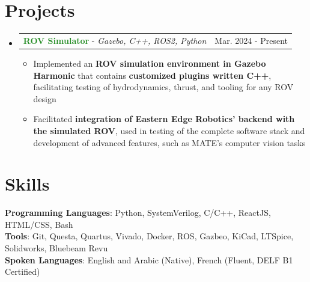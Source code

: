 \documentclass[letterpaper,11pt]{article}
\makeatletter
\newcommand{\resumeItem}[1]{
  \item\small{
    {#1 \vspace{-2pt}}
  }
}
\newcommand{\resumeProjectHeading}[2]{
    \item
    \begin{tabular*}{0.97\textwidth}{l@{\extracolsep{\fill}}r}
      \small#1 & #2 \\
    \end{tabular*}\vspace{-7pt}
}
\newcommand{\resumeSubHeadingListStart}{\begin{itemize}[leftmargin=0.15in, label={}]}
\newcommand{\resumeSubHeadingListEnd}{\end{itemize}}
\newcommand{\resumeItemListStart}{\begin{itemize}}
\newcommand{\resumeItemListEnd}{\end{itemize}\vspace{-5pt}}
\makeatother
\begin{document}
\section{Projects}
    \resumeSubHeadingListStart
      \resumeProjectHeading
          {\textbf{\textcolor{ForestGreen}{ROV Simulator}} - \emph{Gazebo, C++, ROS2, Python}}{Mar. 2024 - Present}
          \resumeItemListStart
            \resumeItem{Implemented an \textbf{ROV simulation environment in Gazebo Harmonic} that contains \textbf{customized 
                        plugins written C++}, facilitating testing of hydrodynamics, thrust, and tooling for any ROV design }
            \resumeItem{Facilitated \textbf{integration of Eastern Edge Robotics' backend with the simulated ROV}, used in
                        testing of the complete software stack and development of advanced features, such as MATE's computer vision tasks}
          \resumeItemListEnd
    \resumeSubHeadingListEnd



%
\section{Skills}
 \begin{itemize}[leftmargin=0.15in, label={}]
    \small{\item{
     \textbf{Programming Languages}{: Python, SystemVerilog, C/C++, ReactJS, HTML/CSS, Bash} \\
     \textbf{Tools}{: Git, Questa, Quartus, Vivado, Docker, ROS, Gazbeo, KiCad, LTSpice, Solidworks, Bluebeam Revu} \\
     \textbf{Spoken Languages}{: English and Arabic (Native), French (Fluent, DELF B1 Certified)}
    }}
 \end{itemize}


\end{document}
